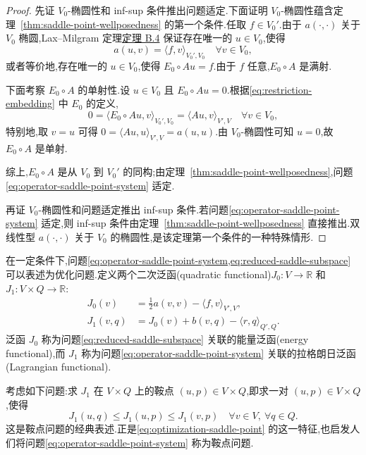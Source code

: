 \begin{proof}
先证 $V_0$-椭圆性和 inf-sup 条件推出问题适定.下面证明 $V_0$-椭圆性蕴含定理~\ref{thm:saddle-point-wellposedness} 的第一个条件.任取 $f\in V_0'$.由于 $a(\cdot,\cdot)$ 关于 $V_0$ 椭圆,Lax--Milgram 定理\hyperref[thm:appendix-b-4]{定理 B.4} 保证存在唯一的 $u\in V_0$,使得
\[
  a(u,v)=\langle f,v\rangle_{V_0',V_0}
  \quad\forall v\in V_0,
\]
或者等价地,存在唯一的 $u\in V_0$,使得 $E_0\circ Au=f$.由于 $f$ 任意,$E_0\circ A$ 是满射.

下面考察 $E_0\circ A$ 的单射性.设 $u\in V_0$ 且 $E_0\circ Au=0$.根据\cref{eq:restriction-embedding} 中 $E_0$ 的定义,
\[
  0=\langle E_0\circ Au,v\rangle_{V_0',V_0}
    =\langle Au,v\rangle_{V',V}
  \quad\forall v\in V_0,
\]
特别地,取 $v=u$ 可得 $0=\langle Au,u\rangle_{V',V}=a(u,u)$.由 $V_0$-椭圆性可知 $u=0$,故 $E_0\circ A$ 是单射.

综上,$E_0\circ A$ 是从 $V_0$ 到 $V_0'$ 的同构;由定理~\ref{thm:saddle-point-wellposedness},问题\cref{eq:operator-saddle-point-system} 适定.

再证 $V_0$-椭圆性和问题适定推出 inf-sup 条件.若问题\cref{eq:operator-saddle-point-system} 适定,则 inf-sup 条件由定理~\ref{thm:saddle-point-wellposedness} 直接推出.双线性型 $a(\cdot,\cdot)$ 关于 $V_0$ 的椭圆性,是该定理第一个条件的一种特殊情形.
\end{proof}

\begin{note}[优化问题表述与鞍点问题]\label{note:optimization-saddle-point}
在一定条件下,问题\cref{eq:operator-saddle-point-system,eq:reduced-saddle-subspace} 可以表述为优化问题.定义两个二次泛函(quadratic functional)$J_0:V\to\mathbb{R}$ 和 $J_1:V\times Q\to\mathbb{R}$:
\[
\begin{aligned}
  J_0(v)&=\frac12a(v,v)-\langle f,v\rangle_{V',V},\\
  J_1(v,q)&=J_0(v)+b(v,q)-\langle r,q\rangle_{Q',Q}.
\end{aligned}
\]
泛函 $J_0$ 称为问题\cref{eq:reduced-saddle-subspace} 关联的能量泛函(energy functional),而 $J_1$ 称为问题\cref{eq:operator-saddle-point-system} 关联的拉格朗日泛函(Lagrangian functional).

考虑如下问题:求 $J_1$ 在 $V\times Q$ 上的鞍点 $(u,p)\in V\times Q$,即求一对 $(u,p)\in V\times Q$,使得
\begin{equation}\label{eq:optimization-saddle-point}
  J_1(u,q)\le J_1(u,p)\le J_1(v,p)
  \quad\forall v\in V,\ \forall q\in Q.
\end{equation}
这是鞍点问题的经典表述.正是\cref{eq:optimization-saddle-point} 的这一特征,也启发人们将问题\cref{eq:operator-saddle-point-system} 称为鞍点问题.
\end{note}

